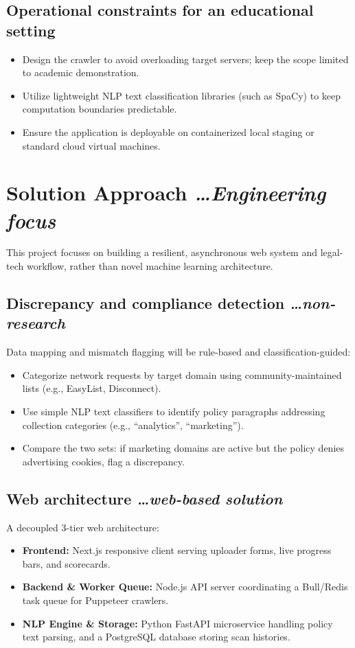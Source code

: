 \documentclass[11pt,a4paper]{article}
\newcommand{\BvrHint}[1]{{\normalfont\normalsize\itshape\hfill #1}}
\begin{document}
\subsection{Operational constraints for an educational setting}
\begin{itemize}[leftmargin=0.7cm]
    \item Design the crawler to avoid overloading target servers; keep the scope limited to academic demonstration.
    \item Utilize lightweight NLP text classification libraries (such as SpaCy) to keep computation boundaries predictable.
    \item Ensure the application is deployable on containerized local staging or standard cloud virtual machines.
\end{itemize}

\section{Solution Approach %
\BvrHint{\ldots Engineering focus}}
This project focuses on building a resilient, asynchronous web system and legal-tech workflow, rather than novel machine learning architecture.

\subsection{Discrepancy and compliance detection %
\BvrHint{\ldots non-research}}
Data mapping and mismatch flagging will be rule-based and classification-guided:
\begin{itemize}[leftmargin=0.7cm]
    \item Categorize network requests by target domain using community-maintained lists (e.g., EasyList, Disconnect).
    \item Use simple NLP text classifiers to identify policy paragraphs addressing collection categories (e.g., ``analytics'', ``marketing'').
    \item Compare the two sets: if marketing domains are active but the policy denies advertising cookies, flag a discrepancy.
\end{itemize}

\subsection{Web architecture %
\BvrHint{\ldots web-based solution}}
A decoupled 3-tier web architecture:
\begin{itemize}[leftmargin=0.7cm]
    \item \textbf{Frontend:} Next.js responsive client serving uploader forms, live progress bars, and scorecards.
    \item \textbf{Backend & Worker Queue:} Node.js API server coordinating a Bull/Redis task queue for Puppeteer crawlers.
    \item \textbf{NLP Engine & Storage:} Python FastAPI microservice handling policy text parsing, and a PostgreSQL database storing scan histories.
\end{itemize}
\end{document}
